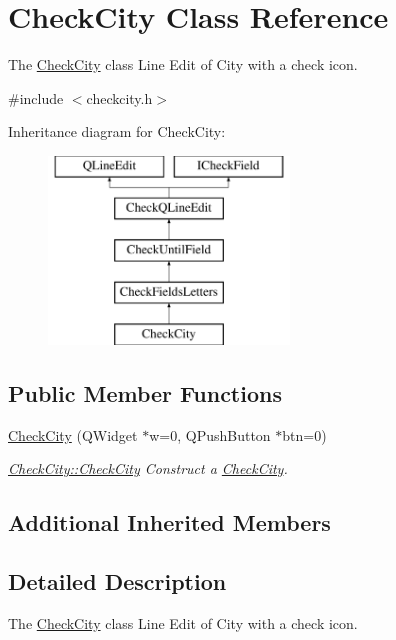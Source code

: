 \hypertarget{classCheckCity}{\section{Check\+City Class Reference}
\label{classCheckCity}
}


The \hyperlink{classCheckCity}{Check\+City} class Line Edit of City with a check icon.  




{\ttfamily \#include $<$checkcity.\+h$>$}

Inheritance diagram for Check\+City\+:\begin{figure}[H]
\begin{center}
\leavevmode
\includegraphics[height=5.000000cm]{de/de9/classCheckCity}
\end{center}
\end{figure}
\subsection*{Public Member Functions}
\begin{DoxyCompactItemize}
\item 
\hyperlink{classCheckCity_a639556875bd01b8cee5cf92759972ca5}{Check\+City} (Q\+Widget $\ast$w=0, Q\+Push\+Button $\ast$btn=0)
\begin{DoxyCompactList}\small\item\em \hyperlink{classCheckCity_a639556875bd01b8cee5cf92759972ca5}{Check\+City\+::\+Check\+City} Construct a \hyperlink{classCheckCity}{Check\+City}. \end{DoxyCompactList}\end{DoxyCompactItemize}
\subsection*{Additional Inherited Members}


\subsection{Detailed Description}
The \hyperlink{classCheckCity}{Check\+City} class Line Edit of City with a check icon. 


